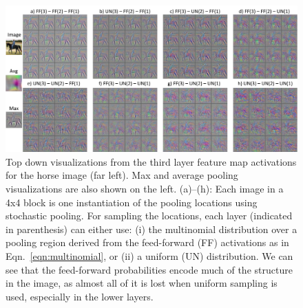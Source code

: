 \documentclass{article} %
\newcommand{\eqn}[1]{Eqn.~\ref{eqn:#1}}
\newcommand{\fig}[1]{Fig.~\ref{fig:#1}}
\def\etal{{\textit{et~al.~}}}
\begin{document}

\begin{figure}[h!]
\vspace*{-0.3cm}
\begin{center}
\includegraphics[width=5.5in]{vis.pdf}
\end{center}
\vspace*{-0.5cm}
\caption{Top down visualizations from the third layer feature map
  activations for the horse image (far left). Max and average pooling
  visualizations are also shown on the left. (a)--(h): Each image in a
  4x4 block is one instantiation of the pooling locations using
  stochastic pooling. For sampling the locations, each layer
  (indicated in parenthesis) can either use: (i) the multinomial
  distribution over a pooling region derived from the feed-forward
  (FF) activations as in \eqn{multinomial}, or (ii) a uniform (UN)
  distribution. We can see that the
  feed-forward probabilities encode much of the structure in the
  image, as almost all of it is lost when uniform sampling is used, especially in
  the lower layers. }
\label{fig:viscifar}
\vspace*{-3mm}
\end{figure}
\end{document}
